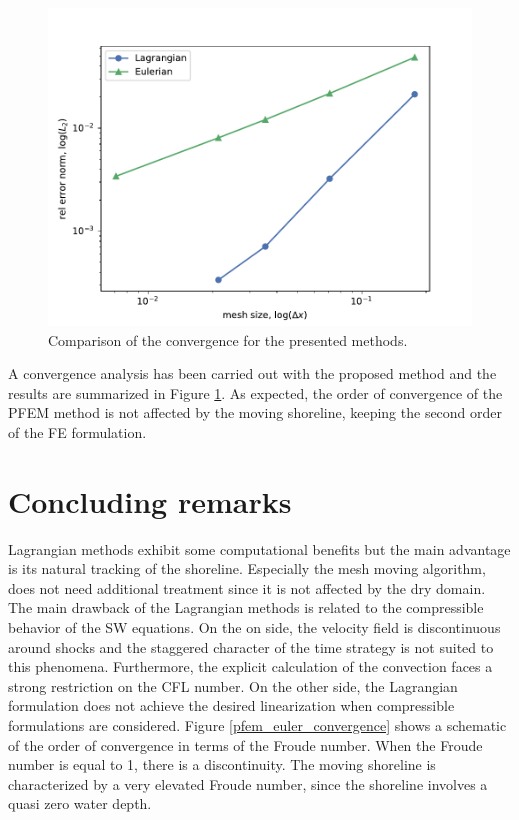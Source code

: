 \begin{figure}
    \centering
    \includegraphics[width=.7\textwidth]{img/lagrangian/convergence}
    \caption{Comparison of the convergence for the presented methods.}
    \label{fig:lagrangian_parabola_convergence}
\end{figure}


A convergence analysis has been carried out with the proposed method and the results are summarized in Figure \ref{fig:lagrangian_parabola_convergence}. As expected, the order of convergence of the PFEM method is not affected by the moving shoreline, keeping the second order of the FE formulation.





\section{Concluding remarks}


Lagrangian methods exhibit some computational benefits but the main advantage is its natural tracking of the shoreline. Especially the mesh moving algorithm, does not need additional treatment since it is not affected by the dry domain. The main drawback of the Lagrangian methods is related to the compressible behavior of the SW equations. On the on side, the velocity field is discontinuous around shocks and the staggered character of the time strategy is not suited to this phenomena. Furthermore, the explicit calculation of the convection faces a strong restriction on the CFL number.
On the other side, the Lagrangian formulation does not achieve the desired linearization when compressible formulations are considered.
Figure \ref{pfem_euler_convergence} shows a schematic of the order of convergence in terms of the Froude number. When the Froude number is equal to 1, there is a discontinuity. The moving shoreline is characterized by a very elevated Froude number, since the shoreline involves a quasi zero water depth.

